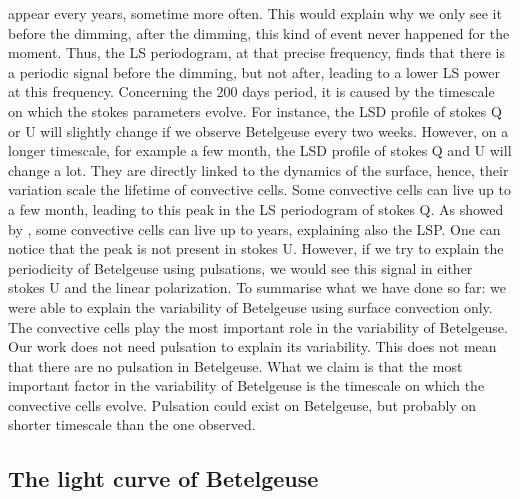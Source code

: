 \documentclass{aa}
\begin{document}
appear every years, sometime more often. This would explain why we only see it before the dimming, after the dimming, this kind of event never happened 
for the moment. Thus, the LS periodogram, at that precise frequency, finds that there is a periodic signal before the dimming, but not after, leading to
a lower LS power at this frequency. Concerning the 200 days period, it is caused by the timescale on which the stokes parameters evolve. For instance, the 
LSD profile of stokes Q or U will slightly change if we observe Betelgeuse every two weeks. However, on a longer timescale, for example a few month, 
the LSD profile of stokes Q and U will change a lot. They are directly linked to the dynamics of the surface, hence,  their variation scale the lifetime 
of convective cells. Some convective cells can live up to a few month, leading to this peak in the LS periodogram of stokes Q. As showed by
\cite{lopez_ariste_convective_2018}, some convective cells can live up to years, explaining also the LSP. One can notice that the peak is not present in stokes U. 
However, if we try to explain the periodicity of Betelgeuse using pulsations, we would see this signal in either stokes U and the linear polarization. 
To summarise what we have done so far: we were able to explain the variability of Betelgeuse using surface convection only. The convective cells play 
the most important role in the variability of Betelgeuse. Our work does not need pulsation to explain its variability. This does not mean that there are 
no pulsation in Betelgeuse. What we claim is that the most important factor in the variability of Betelgeuse is the timescale on which the convective 
cells evolve. Pulsation could exist on Betelgeuse, but probably on shorter timescale than the one observed. 

\subsection{The light curve of Betelgeuse}
\end{document}
